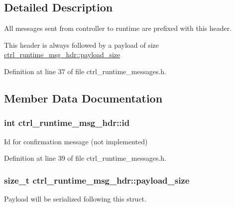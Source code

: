 \subsection{Detailed Description}
All messages sent from controller to runtime are prefixed with this header. 

This header is always followed by a payload of size \hyperlink{structctrl__runtime__msg__hdr_a58295be6c498903d48cb6aa6cf651c01}{ctrl\-\_\-runtime\-\_\-msg\-\_\-hdr\-::payload\-\_\-size} 

Definition at line 37 of file ctrl\-\_\-runtime\-\_\-messages.\-h.



\subsection{Member Data Documentation}
\hypertarget{structctrl__runtime__msg__hdr_a108aad48b5396f75b3168a4f6d380b22}{
\subsubsection[{id}]{\setlength{\rightskip}{0pt plus 5cm}int ctrl\-\_\-runtime\-\_\-msg\-\_\-hdr\-::id}}\label{structctrl__runtime__msg__hdr_a108aad48b5396f75b3168a4f6d380b22}


Id for confirmation message (not implemented) 



Definition at line 39 of file ctrl\-\_\-runtime\-\_\-messages.\-h.

\hypertarget{structctrl__runtime__msg__hdr_a58295be6c498903d48cb6aa6cf651c01}{
\subsubsection[{payload\-\_\-size}]{\setlength{\rightskip}{0pt plus 5cm}size\-\_\-t ctrl\-\_\-runtime\-\_\-msg\-\_\-hdr\-::payload\-\_\-size}}\label{structctrl__runtime__msg__hdr_a58295be6c498903d48cb6aa6cf651c01}


Payload will be serialized following this struct. 



